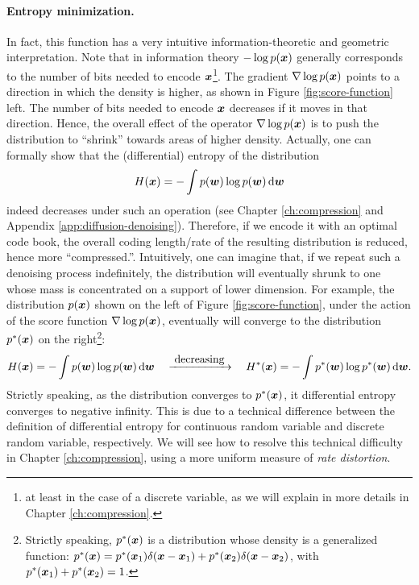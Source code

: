 \documentclass[\toplevelprefix/book-main.tex]{subfiles}
\begin{document}
\paragraph{Entropy minimization.} In fact, this function has a very intuitive information-theoretic and geometric interpretation. Note that in information theory $-\log p(\bm{x})$ generally corresponds to the number of bits needed to encode $\bm{x}$\footnote{at least in the case of a discrete variable, as we will explain in more details in Chapter \ref{ch:compression}.}. The gradient $\nabla \log p(\bm{x})$  points to a direction in which the density is higher, as shown in Figure \ref{fig:score-function} left. The number of bits needed to encode $\bm{x}$ decreases if it moves in that direction. Hence, the overall effect of the operator $\nabla \log p(\bm{x})$ is to push the distribution to ``shrink''  towards areas of higher density. Actually, one can formally show that the (differential) entropy of the distribution 
\begin{equation}
H(\x) = - \int p(\boldsymbol{w}) \log p(\boldsymbol{w}) \odif{\boldsymbol{w}}    \end{equation} 
indeed decreases under such an operation (see Chapter \ref{ch:compression} and Appendix \ref{app:diffusion-denoising}). Therefore, if we encode it with an optimal code book, the overall coding length/rate of the resulting distribution is reduced, hence more ``compressed.''. Intuitively, one can imagine that, if we repeat such a denoising process indefinitely, the distribution will eventually shrunk to one whose mass is concentrated on a support of lower dimension. For example, the distribution $p(\bm{x})$ shown on the left of Figure \ref{fig:score-function},  under the action of the score function $\nabla \log p(\bm{x})$, eventually will converge to the distribution $p^*(\bm{x})$ on the right\footnote{Strictly speaking, $p^*(\bm{x})$ is a distribution whose density is a generalized function: $p^*(\bm{x}) = p^*(\bm{x}_1)\delta(\bm{x}-\bm{x}_1) + p^*(\bm{x}_2) \delta(\bm{x}-\bm{x}_2)$, with $p^*(\bm{x}_1) + p^*(\bm{x}_2) = 1$. }:
\begin{equation}
H(\x) = - \int p(\boldsymbol{w}) \log p(\boldsymbol{w}) \odif{\boldsymbol{w}}  \quad \xrightarrow{\hspace{1mm} \mbox{decreasing} \hspace{1mm}} \quad H^*(\x) = - \int p^*(\boldsymbol{w}) \log p^*(\boldsymbol{w}) \odif{\boldsymbol{w}}.    
\end{equation}
Strictly speaking, as the distribution converges to $p^*(\bm{x})$, it differential entropy converges to negative infinity. This is due to a technical difference between the definition of differential entropy for continuous random variable and discrete random variable, respectively. We will see how to resolve this technical difficulty in Chapter \ref{ch:compression}, using a more uniform measure of {\em rate distortion}.
\end{document}
